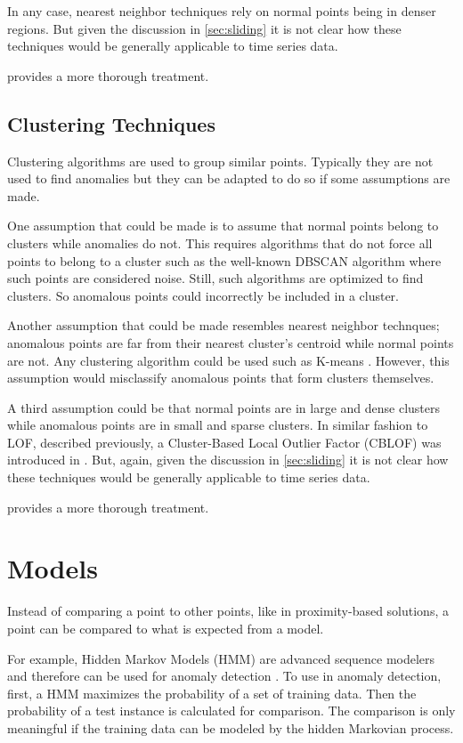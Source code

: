 In any case, nearest neighbor techniques rely on normal points being in denser regions. But given the discussion in \ref{sec:sliding} it is not clear how these techniques would be generally applicable to time series data.

\cite{Chandola2009} provides a more thorough treatment.


\subsection{Clustering Techniques}

Clustering algorithms are used to group similar points. Typically they are not used to find anomalies but they can be adapted to do so if some assumptions are made.

One assumption that could be made is to assume that normal points belong to clusters while anomalies do not. This requires algorithms that do not force all points to belong to a cluster such as the well-known DBSCAN \cite{Ester1996} algorithm where such points are considered noise. Still, such algorithms are optimized to find clusters. So anomalous points could incorrectly be included in a cluster.

Another assumption that could be made resembles nearest neighbor technques; anomalous points are far from their nearest cluster's centroid while normal points are not. Any clustering algorithm could be used such as K-means \cite{Munz2007}. However, this assumption would misclassify anomalous points that form clusters themselves.

A third assumption could be that normal points are in large and dense clusters while anomalous points are in small and sparse clusters. In similar fashion to LOF, described previously, a Cluster-Based Local Outlier Factor (CBLOF) was introduced in \cite{He2003}. But, again, given the discussion in \ref{sec:sliding} it is not clear how these techniques would be generally applicable to time series data.

\cite{Chandola2009} provides a more thorough treatment.


\section{Models}

Instead of comparing a point to other points, like in proximity-based solutions, a point can be compared to what is expected from a model. 

For example, Hidden Markov Models (HMM) are advanced sequence modelers and therefore can be used for anomaly detection \cite{Zhang2003,Qiao2002,qiao2002anomaly,Florez-Larrahondo2005}. To use in anomaly detection, first, a HMM maximizes the probability of a set of training data. Then the probability of a test instance is calculated for comparison. The comparison is only meaningful if the training data can be modeled by the hidden Markovian process.

